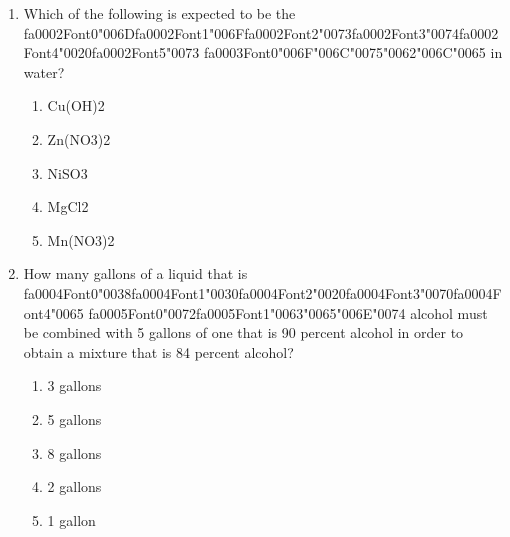 \documentclass[12pt]{article}
\begin{document}
\begin{enumerate}[label=\arabic*.]
explains why?
\begin{enumerate}[label=(\alph*)]
    \item Transition metals will gain their outermost s-block electrons when forming bonds.
    \item Transition metals tend to gain electrons when reacting with other elements.
    \item Transition metals tend to lose electrons when reacting with other elements.
    \item Transition metals all have a minimum of two unpaired electrons.
    \item Transition metals have a maximum of two unpaired electrons.
\end{enumerate}
\item Which of the following is expected to be the {\csname fa0002Font0\endcsname\char"006D}{\csname fa0002Font1\endcsname\char"006F}{\csname fa0002Font2\endcsname\char"0073}{\csname fa0002Font3\endcsname\char"0074}{\csname fa0002Font4\endcsname\char"0020}{\csname fa0002Font5\endcsname\char"0073} {\csname fa0003Font0\endcsname\char"006F}{\char"006C}{\char"0075}{\char"0062}{\char"006C}{\char"0065} in water?
\begin{enumerate}[label=(\alph*)]
    \item Cu(OH)2
    \item Zn(NO3)2
    \item NiSO3
    \item MgCl2
    \item Mn(NO3)2
\end{enumerate}
\item How many gallons of a liquid that is {\csname fa0004Font0\endcsname\char"0038}{\csname fa0004Font1\endcsname\char"0030}{\csname fa0004Font2\endcsname\char"0020}{\csname fa0004Font3\endcsname\char"0070}{\csname fa0004Font4\endcsname\char"0065} {\csname fa0005Font0\endcsname\char"0072}{\csname fa0005Font1\endcsname\char"0063}{\char"0065}{\char"006E}{\char"0074} alcohol must be combined with 5 gallons of
one that is 90 percent alcohol in order to obtain a mixture that is 84 percent alcohol?
\begin{enumerate}[label=(\alph*)]
    \item 3 gallons
    \item 5 gallons
    \item 8 gallons
    \item 2 gallons
    \item 1 gallon
\end{enumerate}
\end{enumerate}
\end{document}
